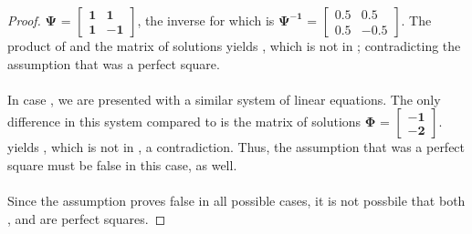\documentclass[preview]{standalone}
\begin{document}
\begin{proof}
    $\bm{\Psi \textbf{ = }} \left[\begin{smallmatrix}
        \bm{1} & \bm{1} \\
        \bm{1} & \bm{-1} 
    \end{smallmatrix}\right]$, 
    the inverse for which is
    $\bm{\Psi^{-1} \textbf{ = }} \left[\begin{smallmatrix}
        \bm{0.5} & \bm{0.5} \\
        \bm{0.5} & \bm{-0.5}
    \end{smallmatrix}\right]$. 
    The product of  and the matrix of solutions yields , 
    which is not in ; 
    contradicting the assumption that  was a perfect square.
    \\ \\ 
    In case , 
    we are presented with a similar system of linear equations. 
    The only difference in this system compared to  is the matrix of solutions 
    $\bm{\Phi \textbf{ = }} \left[\begin{smallmatrix}
        \bm{-1} \\
        \bm{-2}
    \end{smallmatrix}\right]$. 
     yields , 
    which is not in , 
    a contradiction. 
    Thus, the assumption that  was a perfect square must be false in this case, as well.
    \\ \\
    Since the assumption proves false in all possible cases, 
    it is not possbile that both , and \bm{$\eta$} are perfect squares.
\end{proof}
\end{document}
